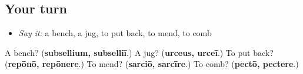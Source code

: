 \subsection*{Your turn}
\begin{itemize}
\raggedright
  \item \emph{Say it:} a bench, a jug, to put back, to mend, to comb
\end{itemize}

\begin{tcolorbox}[breakable,colback=teal!4,colframe=teal!35!black,title={Before you move on}]
A bench? (\textbf{subsellium, subselliī}.) A jug? (\textbf{urceus, urceī}.) To put back? (\textbf{repōnō, repōnere}.) To mend? (\textbf{sarciō, sarcīre}.) To comb? (\textbf{pectō, pectere}.)
\end{tcolorbox}
